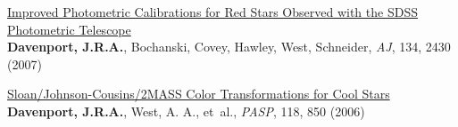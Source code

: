 \begin{etaremune}[leftmargin=10pt]

 \item{\sc \href{http://adsabs.harvard.edu/abs/2007AJ....134.2430D}{\color{NavyBlue}Improved Photometric Calibrations for Red Stars Observed with the SDSS \\Photometric Telescope}}\\
{\bf Davenport, J.R.A.}, Bochanski, Covey, Hawley, West, Schneider, {\em AJ}, 134, 2430 (2007)
 
\item{\sc \href{http://adsabs.harvard.edu/abs/2006PASP..118.1679D}{\color{NavyBlue}Sloan/Johnson-Cousins/2MASS Color Transformations for Cool Stars}}\\
{\bf Davenport, J.R.A.}, West, A. A., et~al., {\em PASP}, 118, 850 (2006)
\end{etaremune}








